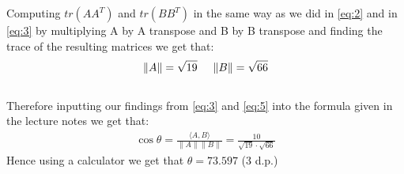 \documentclass[reqno,a4paper,12pt]{amsart}
\begin{document}
Computing $tr(AA^T)$ and $tr(BB^T)$ in the same way as we did in \eqref{eq:2} and in \eqref{eq:3} by multiplying A by A transpose and B by B transpose and finding the trace of the resulting matrices we get that:
    \begin{align}
      \|A\|
      =
      \sqrt{19}\hspace{0.5cm}
      \|B\|
      =
      \sqrt{66}  \label{eq:5}
    \end{align}\\
Therefore inputting our findings from \eqref{eq:3} and \eqref{eq:5} into the formula given in the lecture notes we get that:
    \begin{align}
      \cos\theta = 
      \frac{\langle A,B \rangle}{\|A\|\|B\|}
      =
      \frac{10}{\sqrt{19} \cdot \sqrt{66}} \label{eq:6}
    \end{align}
Hence using a calculator we get that $\theta= 73.597$ (3 d.p.)

     
\end{document}
